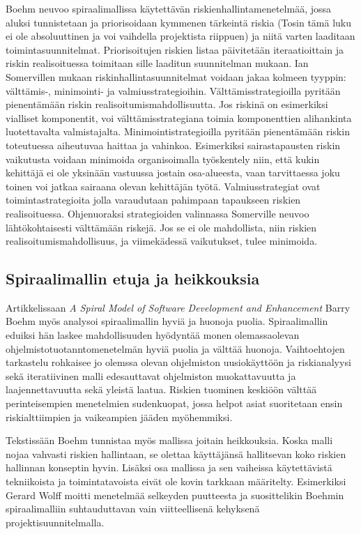 \documentclass[finnish,12pt]{tktltiki2}
\theoremstyle{definition}
\theoremstyle{remark}
\begin{document}
Boehm neuvoo spiraalimallissa käytettävän riskienhallintamenetelmää, jossa aluksi tunnistetaan ja priorisoidaan kymmenen tärkeintä riskia (Tosin tämä luku ei ole absoluuttinen ja voi vaihdella projektista riippuen) ja niitä varten laaditaan toimintasuunnitelmat. Priorisoitujen riskien listaa päivitetään iteraatioittain ja riskin realisoituessa toimitaan sille laaditun suunnitelman mukaan\cite{Boehm:1988:SMS:45797.45801}. Ian Somervillen mukaan riskinhallintasuunnitelmat voidaan jakaa kolmeen tyyppin: välttämis-, minimointi- ja valmiusstrategioihin\cite{Sommerville10}. Välttämisstrategioilla pyritään pienentämään riskin realisoitumismahdollisuutta. Jos riskinä on esimerkiksi vialliset komponentit, voi välttämisstrategiana toimia komponenttien alihankinta luotettavalta valmistajalta. Minimointistrategioilla pyritään pienentämään riskin toteutuessa aiheutuvaa haittaa ja vahinkoa. Esimerkiksi sairastapausten riskin vaikutusta voidaan minimoida organisoimalla työskentely niin, että kukin kehittäjä ei ole yksinään vastuussa jostain osa-alueesta, vaan tarvittaessa joku toinen voi jatkaa sairaana olevan kehittäjän työtä. Valmiusstrategiat ovat toimintastrategioita jolla varaudutaan pahimpaan tapaukseen riskien realisoituessa. Ohjenuoraksi strategioiden valinnassa Somerville neuvoo lähtökohtaisesti välttämään riskejä. Jos se ei ole mahdollista, niin riskien realisoitumismahdollisuus, ja viimekädessä vaikutukset, tulee minimoida.

\subsection{Spiraalimallin etuja ja heikkouksia}

Artikkelissaan \textit{A Spiral Model of Software Development and Enhancement} Barry Boehm myös analysoi spiraalimallin hyviä ja huonoja puolia. Spiraalimallin eduiksi hän laskee mahdollisuuden hyödyntää monen olemassaolevan ohjelmistotuotanntomenetelmän hyviä puolia ja välttää huonoja\cite{Boehm:1988:SMS:45797.45801}. Vaihtoehtojen tarkastelu rohkaisee jo olemssa olevan ohjelmiston uusiokäyttöön ja riskianalyysi sekä iteratiivinen malli edesauttavat ohjelmiston muokattavuutta ja laajennettavuutta sekä yleistä laatua. Riskien tuominen keskiöön välttää perinteisempien menetelmien sudenkuopat, jossa helpot asiat suoritetaan ensin riskialttiimpien ja vaikeampien jääden myöhemmiksi\cite{Wolff:1989:MRS:107446.107478}. 

Tekstissään Boehm tunnistaa myös mallissa joitain heikkouksia. Koska malli nojaa vahvasti riskien hallintaan, se olettaa käyttäjänsä hallitsevan koko riskien hallinnan konseptin hyvin\citep{Boehm:1988:SMS:45797.45801}. Lisäksi osa mallissa ja sen vaiheissa käytettävistä tekniikoista ja toimintatavoista eivät ole kovin tarkkaan määritelty. Esimerkiksi Gerard Wolff moitti menetelmää selkeyden puutteesta ja suosittelikin Boehmin spiraalimalliin suhtauduttavan vain viitteellisenä kehyksenä projektisuunnitelmalla\cite{Wolff:1989:MRS:107446.107478}. 
\end{document}
